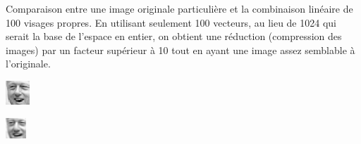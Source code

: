 \begin{adjmulticols}{1}{0in}{-2in}
\begin{center}
\begin{minipage}{0.4\textwidth}
Comparaison entre une image originale particulière et la combinaison
linéaire de 100 visages propres.  En utilisant seulement 100 vecteurs,
au lieu de 1024 qui serait la base de l'espace en entier, on obtient
une réduction (compression des images) par un facteur supérieur à 10
tout en ayant une image assez semblable à l'originale.
\end{minipage}
\hfill
\begin{minipage}{0.45\textwidth}
\includegraphics[width=\linewidth]{./images/clint1}
\end{minipage}
\hfill
\begin{minipage}{0.45\textwidth}
\includegraphics[width=\linewidth]{./images/clint2}

\end{minipage}
\end{center}
\end{adjmulticols}
